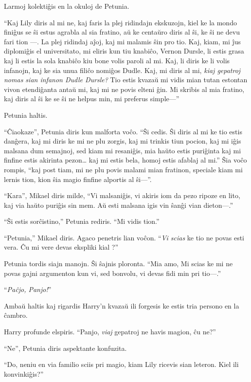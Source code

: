 Larmoj kolektiĝis en la okuloj de Petunia.

``Kaj Lily diris al mi ne, kaj faris la plej ridindajn ekskuzojn, kiel
ke la mondo finiĝus se ŝi estus agrabla al sia fratino, aŭ ke centaŭro
diris al ŝi, ke ŝi ne devu fari tion —. La plej ridindaj aĵoj, kaj mi
malamis ŝin pro tio. Kaj, kiam, mi ĵus diplomiĝis el universitato, mi
eliris kun tiu knabiĉo, Vernon Dursle, li estis grasa kaj li estis la
sola knabiĉo kiu bone volis paroli al mi. Kaj, li diris ke li volis
infanojn, kaj ke sia unua filiĉo nomiĝos Dudle. Kaj, mi diris al mi,
\emph{kiaj gepatroj nomas sian infanon Dudle Dursle?} Tio estis kvazaŭ
mi vidis mian tutan estontan vivon etendiĝanta antaŭ mi, kaj mi ne
povis elteni ĝin. Mi skribis al mia fratino, kaj diris al ŝi ke se ŝi
ne helpus min, mi preferus simple—''

Petunia haltis.

``Ĉiaokaze'', Petunia diris kun malforta voĉo. ``Ŝi cedis. Ŝi diris al
mi ke tio estis danĝera, kaj mi diris ke mi ne plu zorgis, kaj mi
trinkis tiun pocion, kaj mi iĝis malsana dum semajnoj, sed kiam mi
resaniĝis, mia haŭto estis puriĝinta kaj mi finfine estis akirinta
pezon\ldots{} kaj mi estis bela, homoj estis afablaj al mi.'' Ŝia voĉo
rompis, ``kaj post tiam, mi ne plu povis malami mian fratinon,
speciale kiam mi lernis tion, kion ŝia magio finfine alportis al
ŝi—''.

``Kara'', Mikael diris milde, ``Vi malsaniĝis, vi akiris iom da pezo
ripoze en lito, kaj via haŭto puriĝis sin mem. Aŭ esti
malsana igis vin ŝanĝi vian dieton—.''

``Ŝi estis sorĉistino,'' Petunia rediris. ``Mi vidis tion.''

``Petunia,'' Mikael diris. Agaco penetris lian voĉon. ``\emph{Vi scias} ke tio
ne povas esti vera. Ĉu mi vere devas ekspliki kial ?''

Petunia tordis siajn manojn. Ŝi ŝajnis ploronta. ``Mia amo, Mi
scias ke mi ne povas gajni argumenton kun vi, sed bonvolu, vi devas
fidi min pri tio—.''

``\emph{Paĉjo, Panjo!}''

Ambaŭ haltis kaj rigardis Harry'n kvazaŭ ili forgesis ke estis tria
persono en la ĉambro.

Harry profunde elspiris. ``Panjo, \emph{viaj} gepatroj ne havis
magion, ĉu ne?''

``Ne'', Petunia diris aspektante konfuzita. 

``Do, neniu en via familio sciis pri magio, kiam Lily ricevis sian
leteron. Kiel ili konvinkiĝis?''

